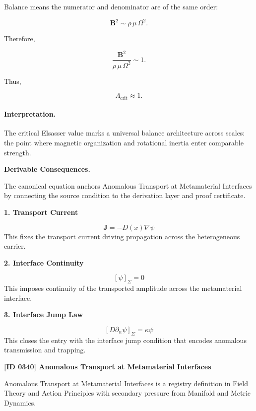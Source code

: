 Balance means the numerator and denominator are of the same order:

\begin{equation}
\mathbf{B}^2
\sim
\rho\,\mu\,\Omega^2 .
\end{equation}

Therefore,

\begin{equation}
\frac{\mathbf{B}^2}
{\rho\,\mu\,\Omega^2}
\sim
1 .
\end{equation}

Thus,

\begin{equation}
\boxed{
\Lambda_{\mathrm{crit}}\approx 1 .
}
\end{equation}

\paragraph{Interpretation.}
The critical Elsasser value marks a universal balance architecture across scales: the point where magnetic organization and rotational inertia enter comparable strength.

\par\vspace{0.35em}
\noindent\textbf{Derivable Consequences.}\quad
\begingroup
\footnotesize
\raggedright
The canonical equation anchors Anomalous Transport at Metamaterial Interfaces by connecting the source condition to the derivation layer and proof certificate.
\par\endgroup

\noindent\textbf{1. Transport Current}\par
\[
\mathbf{J}=-D(x)\nabla\psi
\]
\noindent This fixes the transport current driving propagation across the heterogeneous carrier.\par
\noindent\textbf{2. Interface Continuity}\par
\[
[\psi]_{\Sigma}=0
\]
\noindent This imposes continuity of the transported amplitude across the metamaterial interface.\par
\noindent\textbf{3. Interface Jump Law}\par
\[
[D\partial_{n}\psi]_{\Sigma}=\kappa\psi
\]
\noindent This closes the entry with the interface jump condition that encodes anomalous transmission and trapping.\par

\clearpage
\noindent\textbf{[ID 0340] Anomalous Transport at Metamaterial Interfaces}\par
\vspace{0.35em}
\begingroup\small
{}
Anomalous Transport at Metamaterial Interfaces is a registry definition in Field Theory and Action Principles with secondary pressure from Manifold and Metric Dynamics.


